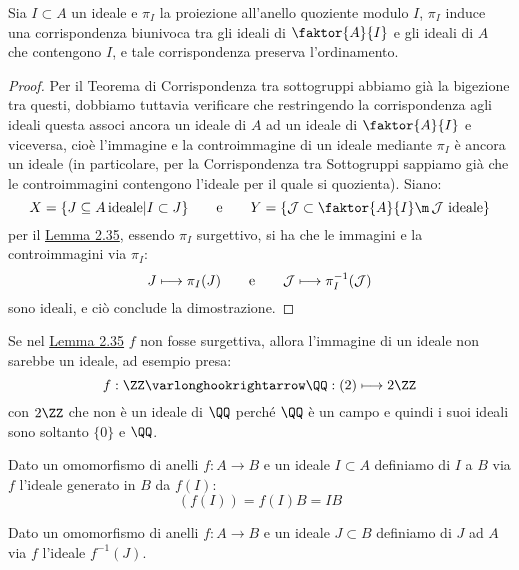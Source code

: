 \documentclass[11pt]{scrartcl}
\begin{document}
\begin{theorem}
    \label{corrispondenza}
    Sia $I \subset A$ un ideale e $\pi_I$ la proiezione all'anello quoziente modulo $I$, $\pi_I$ induce una corrispondenza biunivoca tra gli ideali di $\faktor{A}{I}$ e 
    gli ideali di $A$ che contengono $I$, e tale corrispondenza preserva l'ordinamento.
\end{theorem}

\begin{proof}
Per il Teorema di Corrispondenza tra sottogruppi abbiamo già la bigezione tra questi, dobbiamo tuttavia verificare che restringendo la corrispondenza agli ideali  questa associ ancora un 
ideale di $A$ ad un ideale di $\faktor{A}{I}$ e viceversa, cioè l'immagine e la controimmagine di un ideale mediante $\pi_I$ è ancora un ideale (in particolare, per la Corrispondenza tra Sottogruppi sappiamo già
che le controimmagini contengono l'ideale per il quale si quozienta). Siano:
    \[ X = \{J \subseteq A \, \text{ideale}| I \subset J\} \qquad \text e \qquad Y=\left\{\mathcal{J} \subset \faktor{A}{I} \m \,\text{$\mathcal{J}$ ideale}\right\}
        \]
per il \hyperref[2.35]{Lemma 2.35}, essendo $\pi_I$ surgettivo, si ha che le immagini e la controimmagini via $\pi_I$:
    \[ J \longmapsto \pi_I(J) \qquad \text e \qquad \mathcal{J} \longmapsto \pi_{I}^{-1}(\mathcal{J})
        \]
sono ideali, e ciò conclude la dimostrazione.
\end{proof}

\begin{example}
    Se nel \hyperref[2.35]{Lemma 2.35} $f$ non fosse surgettiva, allora l'immagine di un ideale non sarebbe un ideale, ad esempio presa:
        \[ f : \ZZ \varlonghookrightarrow \QQ : (2) \longmapsto 2\ZZ
            \]
    con $2\ZZ$ che non è un ideale di $\QQ$ perché $\QQ$ è un campo e quindi i suoi ideali sono soltanto $\{0\}$ e $\QQ$.
\end{example}

\begin{definition}
    Dato un omomorfismo di anelli $f: A \longrightarrow B$ e un ideale $I \subset A$ definiamo  di $I$ a $B$ via $f$ l'ideale generato in $B$ da $f(I)$:
        \[ (f(I)) = f(I)B = IB
            \]
\end{definition}

\begin{definition}
    Dato un omomorfismo di anelli $f: A \longrightarrow B$ e un ideale $J \subset B$ definiamo  di $J$ ad $A$ via $f$ l'ideale $f^{-1}(J)$.
\end{definition}
\end{document}
